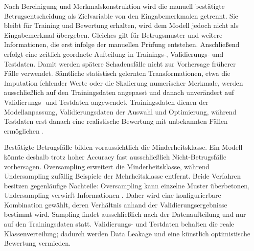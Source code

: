 Nach Bereinigung und Merkmalskonstruktion wird die manuell bestätigte
Betrugsentscheidung als Zielvariable von den Eingabemerkmalen getrennt. Sie
bleibt für Training und Bewertung erhalten, wird dem Modell jedoch nicht als
Eingabemerkmal übergeben. Gleiches gilt für Betrugsmuster und weitere
Informationen, die erst infolge der manuellen Prüfung entstehen. Anschließend
erfolgt eine zeitlich geordnete Aufteilung in Trainings-, Validierungs- und
Testdaten. Damit werden spätere Schadensfälle nicht zur Vorhersage früherer
Fälle verwendet. Sämtliche statistisch gelernten Transformationen, etwa die
Imputation fehlender Werte oder die Skalierung numerischer Merkmale, werden
ausschließlich auf den Trainingsdaten angepasst und danach unverändert auf
Validierungs- und Testdaten angewendet. Trainingsdaten dienen der
Modellanpassung, Validierungsdaten der Auswahl und Optimierung, während
Testdaten erst danach eine realistische Bewertung mit unbekannten Fällen ermöglichen
\citep[S.~20--21]{gerlachSchulz2026}.

Bestätigte Betrugsfälle bilden voraussichtlich die Minderheitsklasse. Ein
Modell könnte deshalb trotz hoher Accuracy fast ausschließlich
Nicht-Betrugsfälle vorhersagen. Oversampling erweitert die Minderheitsklasse,
während Undersampling zufällig Beispiele der Mehrheitsklasse entfernt. Beide
Verfahren besitzen gegenläufige Nachteile: Oversampling kann einzelne Muster
überbetonen, Undersampling verwirft Informationen
\citep[S.~22--24]{gerlachSchulz2026}. Daher wird eine konfigurierbare
Kombination gewählt, deren Verhältnis anhand der Validierungsergebnisse
bestimmt wird. Sampling findet ausschließlich nach der Datenaufteilung und nur
auf den Trainingsdaten statt. Validierungs- und Testdaten behalten die reale
Klassenverteilung; dadurch werden Data Leakage und eine künstlich optimistische
Bewertung vermieden.
